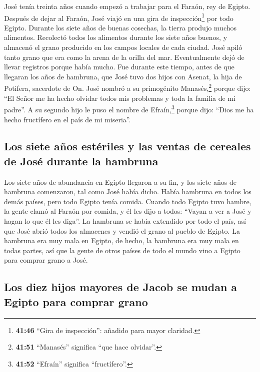 José tenía treinta años cuando empezó a trabajar para el
Faraón, rey de Egipto. Después de dejar al Faraón, José viajó en una
gira de inspección\footnote{\textbf{41:46} ``Gira de inspección'':
  añadido para mayor claridad.} por todo Egipto.  Durante
los siete años de buenas cosechas, la tierra produjo muchos alimentos.
 Recolectó todos los alimentos durante los siete años
buenos, y almacenó el grano producido en los campos locales de cada
ciudad.  José apiló tanto grano que era como la arena de
la orilla del mar. Eventualmente dejó de llevar registros porque había
mucho.  Fue durante este tiempo, antes de que llegaran
los años de hambruna, que José tuvo dos hijos con Asenat, la hija de
Potifera, sacerdote de On.  José nombró a su primogénito
Manasés,\footnote{\textbf{41:51} ``Manasés'' significa ``que hace
  olvidar''.} porque dijo: ``El Señor me ha hecho olvidar todos mis
problemas y toda la familia de mi padre''.  A su segundo
hijo le puso el nombre de Efraín,\footnote{\textbf{41:52} ``Efraín''
  significa ``fructífero''.} porque dijo: ``Dios me ha hecho fructífero
en el país de mi miseria''.

\hypertarget{los-siete-auxf1os-estuxe9riles-y-las-ventas-de-cereales-de-josuxe9-durante-la-hambruna}{%
\subsection{Los siete años estériles y las ventas de cereales de José
durante la
hambruna}\label{los-siete-auxf1os-estuxe9riles-y-las-ventas-de-cereales-de-josuxe9-durante-la-hambruna}}

 Los siete años de abundancia en Egipto llegaron a su
fin,  y los siete años de hambruna comenzaron, tal como
José había dicho. Había hambruna en todos los demás países, pero todo
Egipto tenía comida.  Cuando todo Egipto tuvo hambre, la
gente clamó al Faraón por comida, y él les dijo a todos: ``Vayan a ver a
José y hagan lo que él les diga''.  La hambruna se había
extendido por todo el país, así que José abrió todos los almacenes y
vendió el grano al pueblo de Egipto. La hambruna era muy mala en Egipto,
 de hecho, la hambruna era muy mala en todas partes, así
que la gente de otros países de todo el mundo vino a Egipto para comprar
grano a José.

\hypertarget{los-diez-hijos-mayores-de-jacob-se-mudan-a-egipto-para-comprar-grano}{%
\subsection{Los diez hijos mayores de Jacob se mudan a Egipto para
comprar
grano}\label{los-diez-hijos-mayores-de-jacob-se-mudan-a-egipto-para-comprar-grano}}

